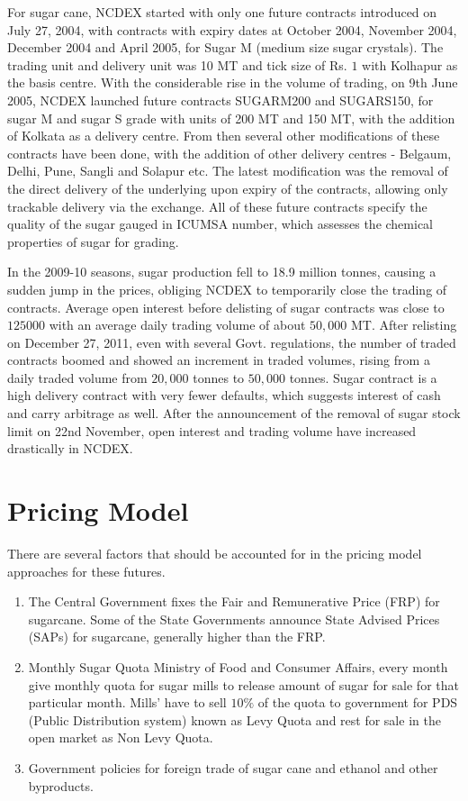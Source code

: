 \documentclass[12pt]{report}
\begin{document}
For sugar cane, NCDEX started with only one future contracts introduced on July 27, 2004, with contracts with expiry dates at October 2004, November 2004, December 2004 and April 2005, for Sugar M (medium size sugar crystals). The trading unit and delivery unit was 10 MT and tick size of Rs. $1$ with Kolhapur as the basis centre. With the considerable rise in the volume of trading, on 9th June 2005, NCDEX launched future contracts SUGARM200 and SUGARS150, for sugar M and sugar S grade with units of 200 MT and 150 MT, with the addition of Kolkata as a delivery centre. From then several other modifications of these contracts have been done, with the addition of other delivery centres - Belgaum, Delhi, Pune, Sangli and Solapur etc. The latest modification was the removal of the direct delivery of the underlying upon expiry of the contracts, allowing only trackable delivery via the exchange. All of these future contracts specify the quality of the sugar gauged in ICUMSA number, which assesses the chemical properties of sugar for grading.  

In the 2009-10 seasons, sugar production fell to 18.9 million tonnes, causing a sudden jump in the prices, obliging NCDEX to temporarily close the trading of contracts. Average open interest before delisting of sugar contracts was close to $125000$ with an average daily trading volume of about $50,000$ MT. After relisting on December 27, 2011, even with several Govt. regulations, the number of traded contracts boomed and showed an increment in traded volumes, rising from a daily traded volume from $20,000$ tonnes to $50,000$ tonnes.  Sugar contract is a high delivery contract with very fewer defaults, which suggests interest of cash and carry arbitrage as well. After the announcement of the removal of sugar stock limit on 22nd November, open interest and trading volume have increased drastically in NCDEX.


\section{Pricing Model}

There are several factors that should be accounted for in the pricing model approaches for these futures.

\begin{enumerate}
    \item The Central Government fixes the Fair and Remunerative Price (FRP) for sugarcane. Some of the State Governments announce State Advised Prices (SAPs) for sugarcane, generally higher than the FRP.
    \item Monthly Sugar Quota Ministry of Food and Consumer Affairs, every month give monthly quota for sugar mills to release amount of sugar for sale for that particular month. Mills' have to sell $10\%$ of the quota to government for PDS (Public Distribution system) known as Levy Quota and rest for sale in the open market as Non Levy Quota.
    \item Government policies for foreign trade of sugar cane and ethanol and other byproducts.
\end{enumerate}
\end{document}
